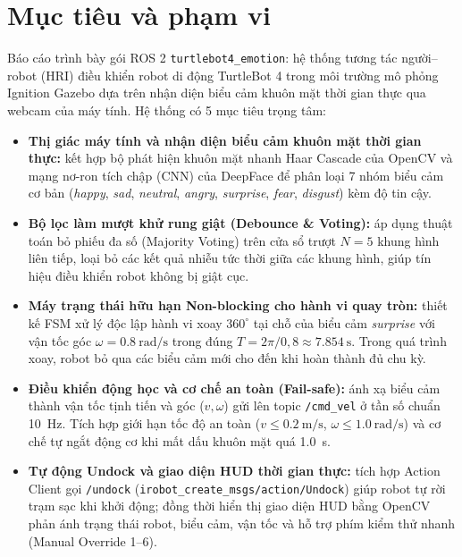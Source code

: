 \section{Mục tiêu và phạm vi}

Báo cáo trình bày gói ROS 2 \texttt{turtlebot4\_emotion}: hệ thống tương tác người--robot (HRI) điều khiển robot di động TurtleBot 4 trong môi trường mô phỏng Ignition Gazebo dựa trên nhận diện biểu cảm khuôn mặt thời gian thực qua webcam của máy tính. Hệ thống có 5 mục tiêu trọng tâm:

\begin{itemize}
    \item \textbf{Thị giác máy tính và nhận diện biểu cảm khuôn mặt thời gian thực:} kết hợp bộ phát hiện khuôn mặt nhanh Haar Cascade của OpenCV và mạng nơ-ron tích chập (CNN) của DeepFace để phân loại 7 nhóm biểu cảm cơ bản (\textit{happy}, \textit{sad}, \textit{neutral}, \textit{angry}, \textit{surprise}, \textit{fear}, \textit{disgust}) kèm độ tin cậy.
    \item \textbf{Bộ lọc làm mượt khử rung giật (Debounce \& Voting):} áp dụng thuật toán bỏ phiếu đa số (Majority Voting) trên cửa sổ trượt $N = 5$ khung hình liên tiếp, loại bỏ các kết quả nhiễu tức thời giữa các khung hình, giúp tín hiệu điều khiển robot không bị giật cục.
    \item \textbf{Máy trạng thái hữu hạn Non-blocking cho hành vi quay tròn:} thiết kế FSM xử lý độc lập hành vi xoay $360^\circ$ tại chỗ của biểu cảm \textit{surprise} với vận tốc góc $\omega = \SI{0.8}{\radian/\second}$ trong đúng $T = 2\pi / 0{,}8 \approx \SI{7.854}{\second}$. Trong quá trình xoay, robot bỏ qua các biểu cảm mới cho đến khi hoàn thành đủ chu kỳ.
    \item \textbf{Điều khiển động học và cơ chế an toàn (Fail-safe):} ánh xạ biểu cảm thành vận tốc tịnh tiến và góc ($v, \omega$) gửi lên topic \texttt{/cmd\_vel} ở tần số chuẩn \SI{10}{\hertz}. Tích hợp giới hạn tốc độ an toàn ($v \le \SI{0.2}{\meter/\second}$, $\omega \le \SI{1.0}{\radian/\second}$) và cơ chế tự ngắt động cơ khi mất dấu khuôn mặt quá \SI{1.0}{\second}.
    \item \textbf{Tự động Undock và giao diện HUD thời gian thực:} tích hợp Action Client gọi \texttt{/undock} (\texttt{irobot\_create\_msgs/action/Undock}) giúp robot tự rời trạm sạc khi khởi động; đồng thời hiển thị giao diện HUD bằng OpenCV phản ánh trạng thái robot, biểu cảm, vận tốc và hỗ trợ phím kiểm thử nhanh (Manual Override 1--6).
\end{itemize}

